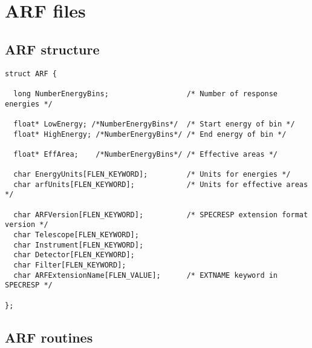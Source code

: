 \documentclass[11pt]{book}
\begin{document}
\section{ARF files}

\subsection{ARF structure}

\begin{verbatim}
struct ARF {

  long NumberEnergyBins;                  /* Number of response energies */

  float* LowEnergy; /*NumberEnergyBins*/  /* Start energy of bin */
  float* HighEnergy; /*NumberEnergyBins*/ /* End energy of bin */

  float* EffArea;    /*NumberEnergyBins*/ /* Effective areas */

  char EnergyUnits[FLEN_KEYWORD];         /* Units for energies */
  char arfUnits[FLEN_KEYWORD];            /* Units for effective areas */

  char ARFVersion[FLEN_KEYWORD];          /* SPECRESP extension format version */
  char Telescope[FLEN_KEYWORD];                             
  char Instrument[FLEN_KEYWORD];
  char Detector[FLEN_KEYWORD];
  char Filter[FLEN_KEYWORD];
  char ARFExtensionName[FLEN_VALUE];      /* EXTNAME keyword in SPECRESP */

};
\end{verbatim}

\subsection{ARF routines}
\end{document}
